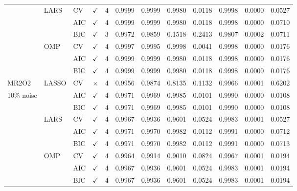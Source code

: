 \documentclass[11pt,a4paper]{article}
\begin{document}
{\begin{longtable}{@{}lllccccccccc@{}}
& LARS & CV & $\checkmark$ & 4 & 0.9999 & 0.9999 & 0.9980 & 0.0118 & 0.9998 & 0.0000 & 0.0527 \\
& & AIC & $\checkmark$ & 4 & 0.9999 & 0.9999 & 0.9980 & 0.0118 & 0.9998 & 0.0000 & 0.0710 \\
& & BIC & $\checkmark$ & 3 & 0.9972 & 0.9859 & 0.1518 & 0.2413 & 0.9807 & 0.0002 & 0.0711 \\
& OMP & CV & $\checkmark$ & 4 & 0.9997 & 0.9995 & 0.9998 & 0.0041 & 0.9998 & 0.0000 & 0.0176 \\
& & AIC & $\checkmark$ & 4 & 0.9999 & 0.9999 & 0.9980 & 0.0118 & 0.9998 & 0.0000 & 0.0176 \\
& & BIC & $\checkmark$ & 4 & 0.9999 & 0.9999 & 0.9980 & 0.0118 & 0.9998 & 0.0000 & 0.0176 \\ \midrule
MR2O2 & LASSO & CV & $\times$ & 4 & 0.9956 & 0.9874 & 0.8135 & 0.1132 & 0.9966 & 0.0001 & 0.6202 \\
10\% noise & & AIC & $\checkmark$ & 4 & 0.9971 & 0.9969 & 0.9985 & 0.0101 & 0.9990 & 0.0000 & 0.0108 \\
& & BIC & $\checkmark$ & 4 & 0.9971 & 0.9969 & 0.9985 & 0.0101 & 0.9990 & 0.0000 & 0.0108 \\
& LARS & CV & $\checkmark$ & 4 & 0.9967 & 0.9936 & 0.9601 & 0.0524 & 0.9983 & 0.0001 & 0.0527 \\
& & AIC & $\checkmark$ & 4 & 0.9971 & 0.9970 & 0.9982 & 0.0112 & 0.9991 & 0.0000 & 0.0712 \\
& & BIC & $\checkmark$ & 4 & 0.9971 & 0.9970 & 0.9982 & 0.0112 & 0.9991 & 0.0000 & 0.0713 \\
& OMP & CV & $\checkmark$ & 4 & 0.9964 & 0.9914 & 0.9010 & 0.0824 & 0.9967 & 0.0001 & 0.0194 \\
& & AIC & $\checkmark$ & 4 & 0.9967 & 0.9936 & 0.9601 & 0.0524 & 0.9983 & 0.0001 & 0.0194 \\
& & BIC & $\checkmark$ & 4 & 0.9967 & 0.9936 & 0.9601 & 0.0524 & 0.9983 & 0.0001 & 0.0194 \\
\end{longtable}
}

\vspace{1cm}
\end{document}
